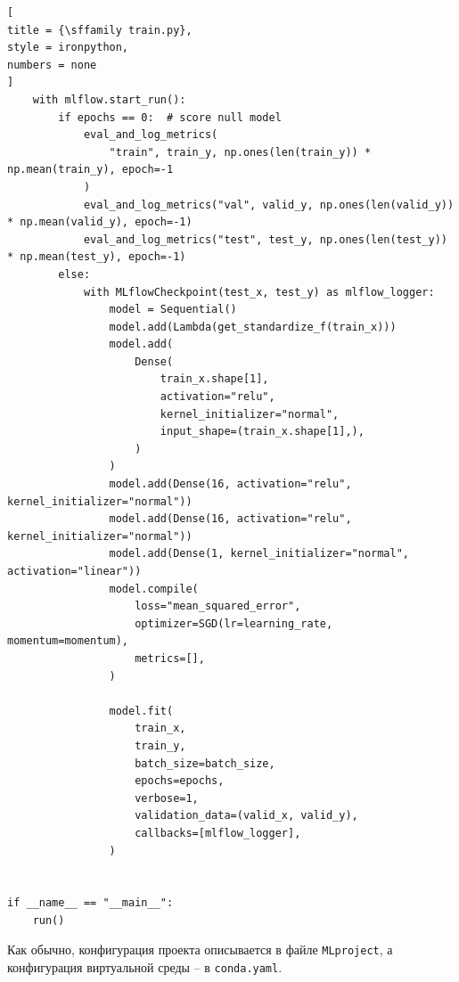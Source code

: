 \documentclass[%
	11pt,
	a4paper,
	utf8,
		]{article}
\begin{document}
\begin{lstlisting}[
title = {\sffamily train.py},
style = ironpython,
numbers = none	
]
	with mlflow.start_run():
		if epochs == 0:  # score null model
			eval_and_log_metrics(
				"train", train_y, np.ones(len(train_y)) * np.mean(train_y), epoch=-1
			)
			eval_and_log_metrics("val", valid_y, np.ones(len(valid_y)) * np.mean(valid_y), epoch=-1)
			eval_and_log_metrics("test", test_y, np.ones(len(test_y)) * np.mean(test_y), epoch=-1)
		else:
			with MLflowCheckpoint(test_x, test_y) as mlflow_logger:
				model = Sequential()
				model.add(Lambda(get_standardize_f(train_x)))
				model.add(
					Dense(
						train_x.shape[1],
						activation="relu",
						kernel_initializer="normal",
						input_shape=(train_x.shape[1],),
					)
				)
				model.add(Dense(16, activation="relu", kernel_initializer="normal"))
				model.add(Dense(16, activation="relu", kernel_initializer="normal"))
				model.add(Dense(1, kernel_initializer="normal", activation="linear"))
				model.compile(
					loss="mean_squared_error",
					optimizer=SGD(lr=learning_rate, momentum=momentum),
					metrics=[],
				)

				model.fit(
					train_x,
					train_y,
					batch_size=batch_size,
					epochs=epochs,
					verbose=1,
					validation_data=(valid_x, valid_y),
					callbacks=[mlflow_logger],
				)


if __name__ == "__main__":
	run()
\end{lstlisting}

Как обычно, конфигурация проекта описывается в файле \texttt{MLproject}, а конфигурация виртуальной среды -- в \texttt{conda.yaml}.
\end{document}
